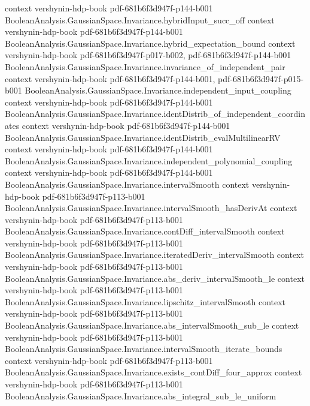\begin{theorem}
  {context}
  {vershynin-hdp-book}
  {pdf-681b6f3d947f-p144-b001}
\proofstep
  {BooleanAnalysis.GaussianSpace.Invariance.hybridInput_succ_off}
  {context}
  {vershynin-hdp-book}
  {pdf-681b6f3d947f-p144-b001}
\proofstep
  {BooleanAnalysis.GaussianSpace.Invariance.hybrid_expectation_bound}
  {context}
  {vershynin-hdp-book}
  {pdf-681b6f3d947f-p017-b002,
    pdf-681b6f3d947f-p144-b001}
\proofstep
  {BooleanAnalysis.GaussianSpace.Invariance.invariance_of_independent_pair}
  {context}
  {vershynin-hdp-book}
  {pdf-681b6f3d947f-p144-b001,
    pdf-681b6f3d947f-p015-b001}
\proofstep
  {BooleanAnalysis.GaussianSpace.Invariance.independent_input_coupling}
  {context}
  {vershynin-hdp-book}
  {pdf-681b6f3d947f-p144-b001}
\proofstep
  {BooleanAnalysis.GaussianSpace.Invariance.identDistrib_of_independent_coordinates}
  {context}
  {vershynin-hdp-book}
  {pdf-681b6f3d947f-p144-b001}
\proofstep
  {BooleanAnalysis.GaussianSpace.Invariance.identDistrib_evalMultilinearRV}
  {context}
  {vershynin-hdp-book}
  {pdf-681b6f3d947f-p144-b001}
\proofstep
  {BooleanAnalysis.GaussianSpace.Invariance.independent_polynomial_coupling}
  {context}
  {vershynin-hdp-book}
  {pdf-681b6f3d947f-p144-b001}
\proofstep
  {BooleanAnalysis.GaussianSpace.Invariance.intervalSmooth}
  {context}
  {vershynin-hdp-book}
  {pdf-681b6f3d947f-p113-b001}
\proofstep
  {BooleanAnalysis.GaussianSpace.Invariance.intervalSmooth_hasDerivAt}
  {context}
  {vershynin-hdp-book}
  {pdf-681b6f3d947f-p113-b001}
\proofstep
  {BooleanAnalysis.GaussianSpace.Invariance.contDiff_intervalSmooth}
  {context}
  {vershynin-hdp-book}
  {pdf-681b6f3d947f-p113-b001}
\proofstep
  {BooleanAnalysis.GaussianSpace.Invariance.iteratedDeriv_intervalSmooth}
  {context}
  {vershynin-hdp-book}
  {pdf-681b6f3d947f-p113-b001}
\proofstep
  {BooleanAnalysis.GaussianSpace.Invariance.abs_deriv_intervalSmooth_le}
  {context}
  {vershynin-hdp-book}
  {pdf-681b6f3d947f-p113-b001}
\proofstep
  {BooleanAnalysis.GaussianSpace.Invariance.lipschitz_intervalSmooth}
  {context}
  {vershynin-hdp-book}
  {pdf-681b6f3d947f-p113-b001}
\proofstep
  {BooleanAnalysis.GaussianSpace.Invariance.abs_intervalSmooth_sub_le}
  {context}
  {vershynin-hdp-book}
  {pdf-681b6f3d947f-p113-b001}
\proofstep
  {BooleanAnalysis.GaussianSpace.Invariance.intervalSmooth_iterate_bounds}
  {context}
  {vershynin-hdp-book}
  {pdf-681b6f3d947f-p113-b001}
\proofstep
  {BooleanAnalysis.GaussianSpace.Invariance.exists_contDiff_four_approx}
  {context}
  {vershynin-hdp-book}
  {pdf-681b6f3d947f-p113-b001}
\proofstep
  {BooleanAnalysis.GaussianSpace.Invariance.abs_integral_sub_le_uniform}

\end{theorem}
